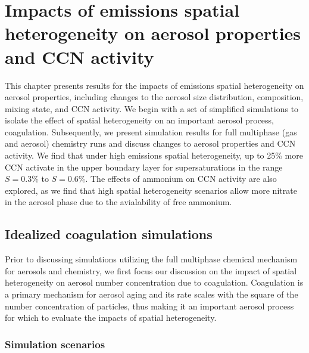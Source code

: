 \chapter{Impacts of emissions spatial heterogeneity on aerosol properties and CCN activity}

This chapter presents results for the impacts of emissions spatial heterogeneity on aerosol properties, including changes to the aerosol size distribution, composition, mixing state, and CCN activity. We begin with a set of simplified simulations to isolate the effect of spatial heterogeneity on an important aerosol process, coagulation. Subsequently, we present simulation results for full multiphase (gas and aerosol) chemistry runs and discuss changes to aerosol properties and CCN activity. We find that under high emissions spatial heterogeneity, up to 25\% more CCN activate in the upper boundary layer for supersaturations in the range $S=0.3\%$ to $S=0.6\%$. The effects of ammonium on CCN activity are also explored, as we find that high spatial heterogeneity scenarios allow more nitrate in the aerosol phase due to the avialability of free ammonium.
\section{Idealized coagulation simulations}

Prior to discussing simulations utilizing the full multiphase chemical mechanism for aerosols and chemistry, we first focus our discussion on the impact of spatial heterogeneity on aerosol number concentration due to coagulation. Coagulation is a primary mechanism for aerosol aging and its rate scales with the square of the number concentration of particles, thus making it an important aerosol process for which to evaluate the impacts of spatial heterogeneity. 

\subsection{Simulation scenarios}

